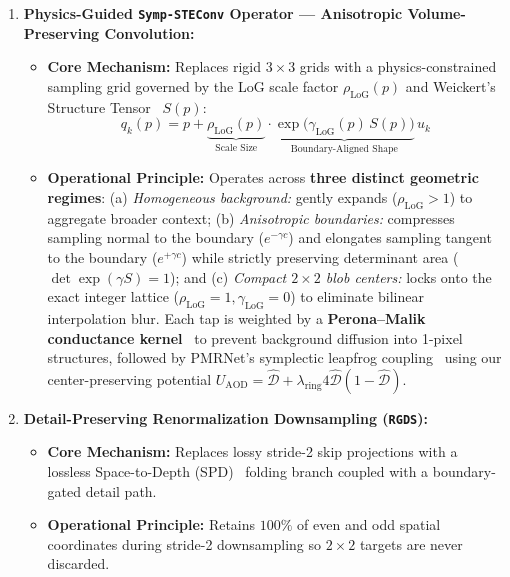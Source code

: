 \documentclass[11pt,a4paper]{article}
\begin{document}
\begin{enumerate}[leftmargin=1.6em]
    \item \textbf{Physics-Guided \texttt{Symp-STEConv} Operator --- Anisotropic Volume-Preserving Convolution:}
    \begin{itemize}[leftmargin=1.2em]
        \item \textbf{Core Mechanism:} Replaces rigid $3\times 3$ grids with a physics-constrained sampling grid governed by the LoG scale factor $\rho_{\text{LoG}}(p)$ and Weickert's Structure Tensor~\cite{weickert1999coherence} $S(p)$:
        \begin{equation}
            q_k(p) = p + \underbrace{\rho_{\text{LoG}}(p)}_{\text{Scale Size}} \cdot \underbrace{\exp\!\big(\gamma_{\text{LoG}}(p)\, S(p)\big)}_{\text{Boundary-Aligned Shape}}\, u_k
            \label{eq:symp_steconv}
        \end{equation}
        \item \textbf{Operational Principle:} Operates across \textbf{three distinct geometric regimes}:
        (a) \emph{Homogeneous background:} gently expands ($\rho_{\text{LoG}} > 1$) to aggregate broader context;
        (b) \emph{Anisotropic boundaries:} compresses sampling normal to the boundary ($e^{-\gamma c}$) and elongates sampling tangent to the boundary ($e^{+\gamma c}$) while strictly preserving determinant area ($\det \exp(\gamma S) = 1$); and
        (c) \emph{Compact $2\times 2$ blob centers:} locks onto the exact integer lattice ($\rho_{\text{LoG}}=1, \gamma_{\text{LoG}}=0$) to eliminate bilinear interpolation blur. Each tap is weighted by a \textbf{Perona--Malik conductance kernel}~\cite{perona1990anisotropic} to prevent background diffusion into 1-pixel structures, followed by PMRNet's symplectic leapfrog coupling~\cite{kang2026pmrnet} using our center-preserving potential $U_{\text{AOD}} = \hat{\mathcal{D}} + \lambda_{\text{ring}}4\hat{\mathcal{D}}(1-\hat{\mathcal{D}})$.
    \end{itemize}

    \item \textbf{Detail-Preserving Renormalization Downsampling (\texttt{RGDS}):}
    \begin{itemize}[leftmargin=1.2em]
        \item \textbf{Core Mechanism:} Replaces lossy stride-2 skip projections with a lossless Space-to-Depth (SPD)~\cite{sunkara2022spd,liu2025decof} folding branch coupled with a boundary-gated detail path.
        \item \textbf{Operational Principle:} Retains $100\%$ of even and odd spatial coordinates during stride-2 downsampling so $2\times 2$ targets are never discarded.
    \end{itemize}


\end{enumerate}
\end{document}
